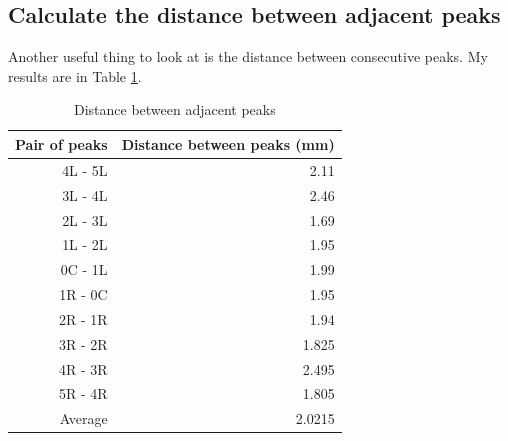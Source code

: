 \subsection{Calculate the distance between adjacent peaks}
Another useful thing to look at is the distance between consecutive peaks. My results are in Table \ref{table.disA}.
\begin{table}[ht!]
	\centering
	\begin{tabular}{|r|r|} \hline
		Pair of peaks & Distance between peaks (mm) \\
		\hline
		4L - 5L & 2.11 \\
		3L - 4L & 2.46 \\
		2L - 3L & 1.69 \\
		1L - 2L & 1.95 \\
		0C - 1L & 1.99 \\
		1R - 0C & 1.95 \\
		2R - 1R & 1.94 \\
		3R - 2R & 1.825 \\
		4R - 3R & 2.495 \\
		5R - 4R & 1.805 \\
		\hline
		Average & 2.0215 \\
		\hline
	\end{tabular}
	\caption{Distance between adjacent peaks}
	\label{table.disA}
\end{table}
